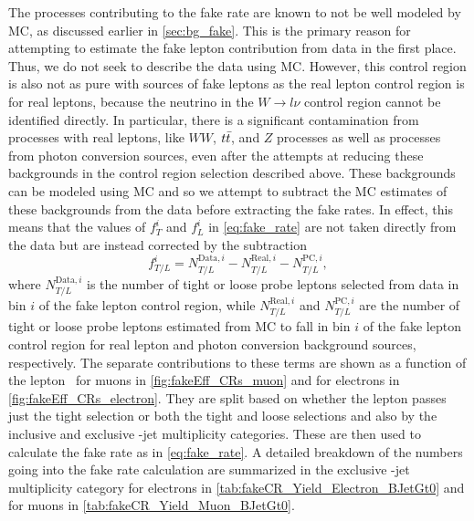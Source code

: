 The processes contributing to the fake rate are known
to not be well modeled by MC, as discussed earlier in \sec\ref{sec:bg_fake}.
This is the primary reason for attempting to estimate the fake
lepton contribution from data in the first place. Thus,
we do not seek to describe the data using MC.
However, this control region is also not as pure with sources
of fake leptons as the real lepton control region is for real leptons,
because the neutrino in the $W\rightarrow l\nu$ control region
cannot be identified directly.
In particular, there is a significant contamination from processes
with real leptons, like $WW$, $t\bar{t}$, and $Z$ processes as well
as processes from photon conversion sources, even after the attempts
at reducing these backgrounds in the control region selection described above.
These backgrounds can be modeled using MC and so we attempt to subtract the
MC estimates of these backgrounds from the data before extracting the fake
rates. In effect, this means that the values of $f_{T}^{i}$ and
$f_{L}^i$ in \eqn\eqref{eq:fake_rate} are not taken directly from the
data but are instead corrected by the subtraction
\begin{equation}
\label{eq:fake_num_breakdown}
f_{T/L}^{i} = 
N^{\textrm{Data},i}_{T/L} 
- N^{\textrm{Real},i}_{T/L}
- N^{\textrm{PC},i}_{T/L},
\end{equation}
where $N^{\textrm{Data},i}_{T/L}$ is the number of tight or loose
probe leptons selected from data in bin $i$ of the fake lepton control region,
while $N^{\textrm{Real},i}_{T/L}$  and $N^{\textrm{PC},i}_{T/L}$
are the number of tight or loose probe leptons estimated from MC
to fall in bin $i$ of the fake lepton control region for real
lepton and photon conversion background sources, respectively.
The separate contributions to these terms are shown as a function
of the lepton \pt~for muons in \fig\ref{fig:fakeEff_CRs_muon} and for electrons
in \fig\ref{fig:fakeEff_CRs_electron}. They are split based on whether the lepton
passes just the tight selection or both the tight and loose selections
and also by the inclusive and exclusive \bee-jet multiplicity categories.
These are then used to calculate the fake rate as in \eqn\eqref{eq:fake_rate}.
A detailed breakdown of the numbers going into the fake rate calculation
are summarized in the exclusive \bee-jet multiplicity category for 
electrons in \tab\ref{tab:fakeCR_Yield_Electron_BJetGt0}
and for muons in \tab\ref{tab:fakeCR_Yield_Muon_BJetGt0}.


